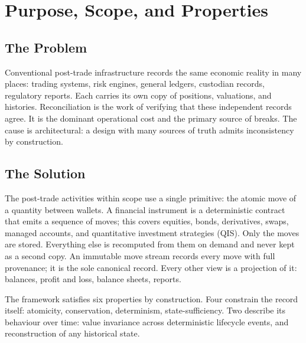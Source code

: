 \section{Purpose, Scope, and Properties}
\label{sec:intro}

\subsection{The Problem}

Conventional post-trade infrastructure records the same economic reality in many places: trading systems, risk engines, general ledgers, custodian records, regulatory reports. Each carries its own copy of positions, valuations, and histories. Reconciliation is the work of verifying that these independent records agree. It is the dominant operational cost and the primary source of breaks. The cause is architectural: a design with many sources of truth admits inconsistency by construction.

\subsection{The Solution}

The post-trade activities within scope use a single primitive: the atomic move of a quantity between wallets. A financial instrument is a deterministic contract that emits a sequence of moves; this covers equities, bonds, derivatives, swaps, managed accounts, and quantitative investment strategies (QIS). Only the moves are stored. Everything else is recomputed from them on demand and never kept as a second copy. An immutable move stream records every move with full provenance; it is the sole canonical record. Every other view is a projection of it: balances, profit and loss, balance sheets, reports.

The framework satisfies six properties by construction. Four constrain the record itself: atomicity, conservation, determinism, state-sufficiency. Two describe its behaviour over time: value invariance across deterministic lifecycle events, and reconstruction of any historical state.

